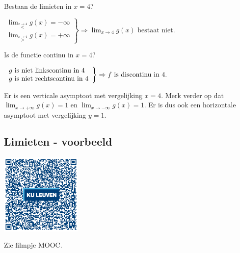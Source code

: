 \begin{voorbeeld}
	\ \\

Bestaan de limieten in $x=4$?

\begin{math}
\left. \begin{array}{l}
\lim_{\overset{x\rightarrow4}{<}}g(x)=-\infty \\
 \lim_{\overset{x\rightarrow4}{>}}g(x)=+\infty
\end{array}
\right\}
\Rightarrow \lim_{x\to4}g(x) \text{ bestaat niet}.
\end{math}

Is de functie continu in $x=4$?

\begin{math}
\centering
\left. \begin{array}{l}
g \text{ is niet linkscontinu in }4\\
g \text{ is niet rechtscontinu in }4
\end{array}
\right\}
\Rightarrow f \text{ is discontinu in }4.
\end{math}

Er is een verticale asymptoot met vergelijking $x=4$.
Merk verder op dat $\lim_{x\rightarrow+\infty}g(x)=1$ en $\lim_{x\rightarrow-\infty}g(x)=1$.
Er is dus ook een horizontale asymptoot met vergelijking $y=1$.

\end{voorbeeld}

\subsection{Limieten - voorbeeld}

\begin{minipage}{.25\linewidth}
	\raggedright
	\includegraphics[width=4cm]{2_elem_rekenvaardigheden_B/inputs/QR_Code_LIMIETENVOORBEELD_module2new}
\end{minipage}
\begin{minipage}{.7\linewidth}
	Zie filmpje MOOC.
\end{minipage}

